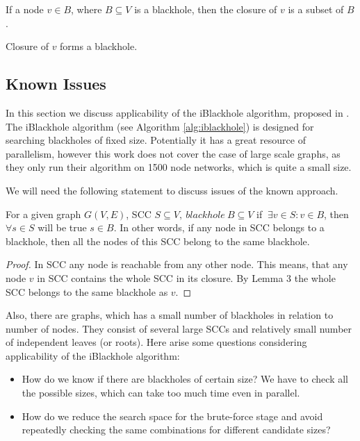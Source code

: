\documentclass{svproc}
\begin{document}
\begin{lemma}
If a node $v \in B$, where $B \subseteq V$ is a blackhole, then the closure of $v$ is a subset of $B$.
\end{lemma}

\begin{lemma}
Closure of $v$ forms a blackhole.
\end{lemma}


\subsection{Known Issues}
In this section we discuss applicability of the iBlackhole algorithm, proposed in \cite{li2010detecting}.
The iBlackhole algorithm (see Algorithm \ref{alg:iblackhole}) is designed for searching blackholes of fixed size. Potentially it has a great resource of parallelism, however this work does not cover the case of large scale graphs, as they only run their algorithm on 1500 node networks, which is quite
a small size.

We will need the following statement to discuss issues of the known approach.
\begin{lemma}
	For a given graph $G(V,E)$, SCC $S \subseteq V,\ blackhole\ B \subseteq V$ if $\ \exists v \in S: v \in B$,  then $\forall s \in S$ will be true $s \in B$.
	In other words, if any node in SCC belongs to a blackhole, then all the nodes of this SCC belong to the same blackhole.
\end{lemma}
\begin{proof}
	In SCC any node is reachable from any other node. This means, that any node $v$ in SCC contains the whole SCC in its closure. By Lemma 3 the whole SCC belongs to the same blackhole as $v$. 
\end{proof}

Also, there are graphs, which has a small number of blackholes in relation to number of nodes. They consist
of several large SCCs and relatively small number of independent leaves (or roots). Here arise some questions considering applicability of the
iBlackhole algorithm:
\begin{itemize}
\item How do we know if there are blackholes of certain size? We have to check all the possible sizes, which can take too much time even in parallel.
\item How do we reduce the search space for the brute-force stage and avoid repeatedly checking the same combinations for different candidate sizes?
\end{itemize}
\end{document}
